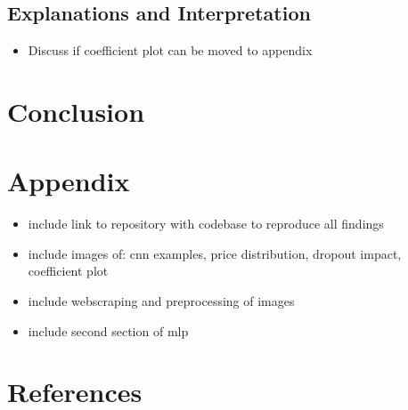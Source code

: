 \documentclass[12pt, letterpaper]{article}
\begin{document}

\subsection{Explanations and Interpretation} %

\begin{itemize}
    \item Discuss if coefficient plot can be moved to appendix
\end{itemize}


\section{Conclusion} %


\section{Appendix}
\begin{itemize}
    \item include link to repository with codebase to reproduce all findings
    \item include images of: cnn examples, price distribution, dropout impact, coefficient plot
    \item include webscraping and preprocessing of images
    \item include second section of mlp
\end{itemize}


\section{References}
\end{document}
